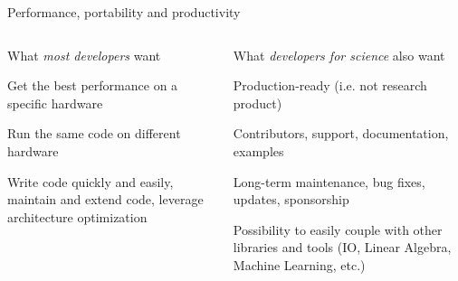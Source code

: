 \documentclass[
    aspectratio=169,
]{beamer}
\begin{document}
\begin{frame}{Performance, portability and productivity}
    \begin{columns}[T]
        \begin{column}{0.45\linewidth}
            What \emph{most developers} want

            \vspace{1em}

            \begin{description}[Performance]
                \item[Performance] Get the best performance on a specific hardware
                \item[Portability] Run the same code on different hardware
                \item[Productivity] Write code quickly and easily, maintain and extend code, leverage architecture optimization
            \end{description}
        \end{column}
        \pause
        \begin{column}{0.55\linewidth}
            What \emph{developers for science} also want

            \vspace{1em}

            \begin{description}[Interporability]
                \item[Maturity] Production-ready (i.e. not research product)
                \item[Community] Contributors, support, documentation, examples
                \item[Longevity] Long-term maintenance, bug fixes, updates, sponsorship
                \item[Interporability] Possibility to easily couple with other libraries and tools (IO, Linear Algebra, Machine Learning, etc.)
            \end{description}
        \end{column}
    \end{columns}
\end{frame}

\end{document}
